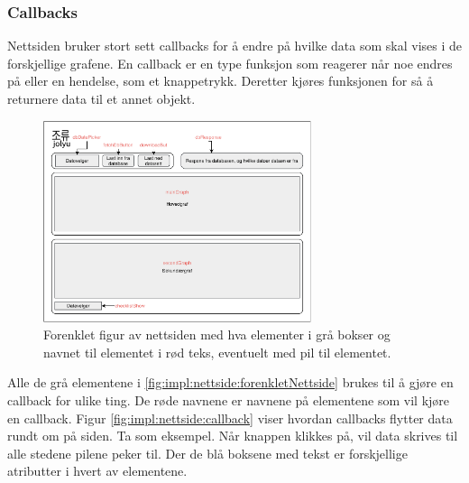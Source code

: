 \subsubsection{Callbacks}\label{sec:impl:nettside:callback}

Nettsiden bruker stort sett callbacks for å endre på hvilke data som skal vises i de forskjellige grafene. 
En callback er en type funksjon som reagerer når noe endres på eller en hendelse, som et knappetrykk. 
Deretter kjøres funksjonen for så å returnere data til et annet objekt. 

\begin{figure}[!htbp]
    \centering
    \includegraphics[width=0.7\textwidth]{implementering/nettside/NettsideEnkel.pdf}
    \caption{Forenklet figur av nettsiden med hva elementer i grå bokser og navnet til elementet i rød teks, eventuelt med pil til elementet.}
    \label{fig:impl:nettside:forenkletNettside}
\end{figure}

Alle de grå elementene i \autoref{fig:impl:nettside:forenkletNettside} brukes til å gjøre en callback for ulike ting. 
De røde navnene er navnene på elementene som vil kjøre en callback.
Figur \ref{fig:impl:nettside:callback} viser hvordan callbacks flytter data rundt om på siden. 
Ta  som eksempel. 
Når knappen klikkes på, vil data skrives til alle stedene pilene peker til. 
Der de blå boksene med tekst er forskjellige atributter i hvert av elementene.


